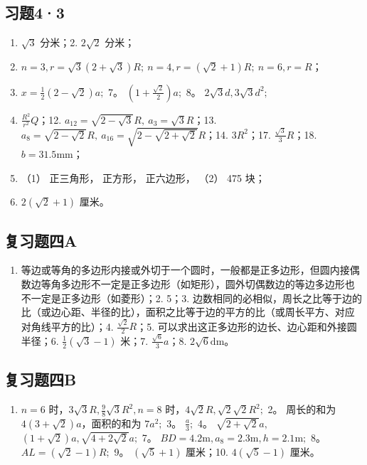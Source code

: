\subsection{习题4·3}

\begin{enumerate}
\item
  \(\sqrt{3}\) 分米；2. \(2\sqrt{2}\) 分米；
\item
  \(n=3, r=\sqrt{3}(2+\sqrt{3})R;\ n=4, r=(\sqrt{2}+1)R;\ n=6, r=R\)；
\item
  \(x = \frac{1}{2} (2 - \sqrt{2})a;\) 7。
  \(\left(1 + \frac{\sqrt{2}}{2}\right)a;\) 8。
  \(2\sqrt{3} d, 3\sqrt{3} d^2;\)
\item
  \(\frac{R^2}{r^2}Q\)；12.
  \(a_{12}=\sqrt{2-\sqrt{3}}R,\ a_3=\sqrt{3}R\)；13.
  \(a_8=\sqrt{2-\sqrt{2}}R,\ a_{16}=\sqrt{2-\sqrt{2+\sqrt{2}}}R\)；14.
  \(3R^2\)；17. \(\frac{\sqrt{3}}{3}R\)；18. \(b=31.5\mathrm{mm}\)；
\item
  （1） 正三角形， 正方形， 正六边形， （2） 475 块；
\item
  \(2(\sqrt{2}+1)\) 厘米。
\end{enumerate}

\subsection{复习题四A}

\begin{enumerate}
\item
  等边或等角的多边形内接或外切于一个圆时，一般都是正多边形，但圆内接偶数边等角多边形不一定是正多边形（如矩形），圆外切偶数边的等边多边形也不一定是正多边形（如菱形）；2.
  5；3.
  边数相同的必相似，周长之比等于边的比（或边心距、半径的比），面积之比等于边的平方的比（或周长平方、对应对角线平方的比）；4.
  \(\frac{\sqrt{2}}{2} R\)；5.
  可以求出这正多边形的边长、边心距和外接圆半径；6.
  \(\frac{1}{2} (\sqrt{3} - 1)\) 米；7. \(\frac{\sqrt{6}}{3} a\)；8.
  \(2\sqrt{6}\mathrm{dm}\)。
\end{enumerate}

\subsection{复习题四B}

\begin{enumerate}
\item
  \(n = 6\) 时，\(3\sqrt{3} R, \frac{9}{8}\sqrt{3} R^2, n = 8\)
  时，\(4\sqrt{2} R, \sqrt{2}\sqrt{2} R^2;\) 2。 周长的和为
  \(4(3 + \sqrt{2})a\)，面积的和为 \(7a^2;\) 3。 \(\frac{a}{3};\) 4。
  \(\sqrt{2 + \sqrt{2}} a,\)
  \((1 + \sqrt{2})a, \sqrt{4 + 2\sqrt{2}} a;\) 7。
  \(BD = 4.2\mathrm{m}, a_8 = 2.3\mathrm{m}, h = 2.1\mathrm{m};\) 8。
  \(AL = (\sqrt{2} - 1)R;\) 9。 \((\sqrt{5} + 1)\) 厘米；10.
  \(4(\sqrt{5} - 1)\) 厘米。
\end{enumerate}

